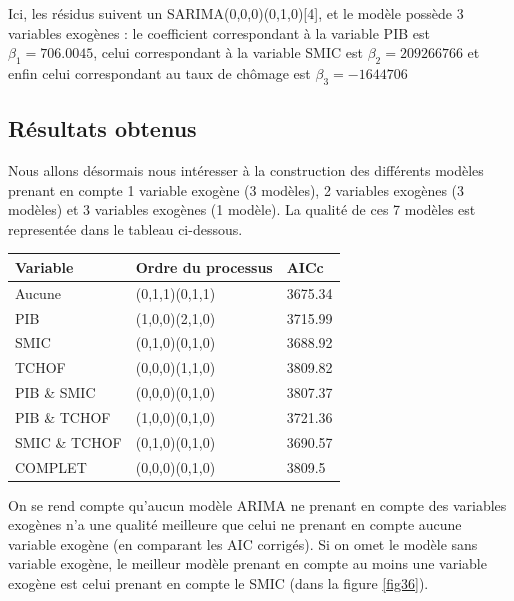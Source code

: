 \documentclass[11pt,]{article}
\begin{document}
Ici, les résidus suivent un SARIMA(0,0,0)(0,1,0){[}4{]}, et le modèle
possède 3 variables exogènes : le coefficient correspondant à la
variable PIB est \(\beta_1 = 706.0045\), celui correspondant à la
variable SMIC est \(\beta_2 = 209266766\) et enfin celui correspondant
au taux de chômage est \(\beta_3 = -1644706\)

\subsection{Résultats obtenus}\label{resultats-obtenus-2}

Nous allons désormais nous intéresser à la construction des différents
modèles prenant en compte 1 variable exogène (3 modèles), 2 variables
exogènes (3 modèles) et 3 variables exogènes (1 modèle). La qualité de
ces 7 modèles est representée dans le tableau ci-dessous.

\begin{longtable}[]{@{}lll@{}}
\toprule
Variable & Ordre du processus & AICc\tabularnewline
\midrule
\endhead
Aucune & (0,1,1)(0,1,1) & 3675.34\tabularnewline
PIB & (1,0,0)(2,1,0) & 3715.99\tabularnewline
SMIC & (0,1,0)(0,1,0) & 3688.92\tabularnewline
TCHOF & (0,0,0)(1,1,0) & 3809.82\tabularnewline
PIB \& SMIC & (0,0,0)(0,1,0) & 3807.37\tabularnewline
PIB \& TCHOF & (1,0,0)(0,1,0) & 3721.36\tabularnewline
SMIC \& TCHOF & (0,1,0)(0,1,0) & 3690.57\tabularnewline
COMPLET & (0,0,0)(0,1,0) & 3809.5\tabularnewline
\bottomrule
\end{longtable}

On se rend compte qu'aucun modèle ARIMA ne prenant en compte des
variables exogènes n'a une qualité meilleure que celui ne prenant en
compte aucune variable exogène (en comparant les AIC corrigés). Si on
omet le modèle sans variable exogène, le meilleur modèle prenant en
compte au moins une variable exogène est celui prenant en compte le SMIC
(dans la figure \ref{fig36}).
\end{document}
